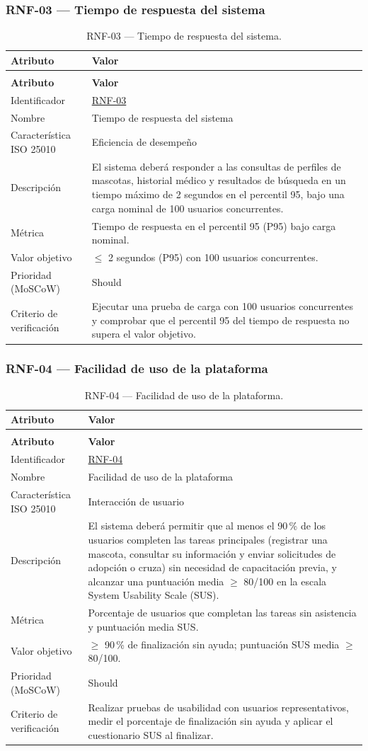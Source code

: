\documentclass[journal,onecolumn]{IEEEtran}
\makeatletter
\newenvironment{atributos}[2]{%
	\small
	\begin{longtable}{@{}>{\raggedright\arraybackslash}p{4.2cm} >{\raggedright\arraybackslash}p{11.2cm}@{}}
		\caption{#2}\label{tab:#1}\\
		\toprule
		\textbf{Atributo} & \textbf{Valor} \\
		\midrule
		\endfirsthead
		\multicolumn{2}{@{}l}{\small\itshape (continuación)}\\
		\toprule
		\textbf{Atributo} & \textbf{Valor} \\
		\midrule
		\endhead
		\bottomrule
		\endlastfoot
	}{%
	\end{longtable}
	\normalsize
}
\makeatother
\begin{document}
	
	\subsubsection{RNF-03 --- Tiempo de respuesta del sistema}
	
	\begin{atributos}{RNF-03}{RNF-03 --- Tiempo de respuesta del sistema.}
		Identificador & \hyperref[tab:RNF-03]{RNF-03} \\
		Nombre & Tiempo de respuesta del sistema \\
		Característica ISO 25010 & Eficiencia de desempeño \\
		Descripción & El sistema deberá responder a las consultas de perfiles de mascotas, historial médico y resultados de búsqueda en un tiempo máximo de 2 segundos en el percentil 95, bajo una carga nominal de 100 usuarios concurrentes. \\
		Métrica & Tiempo de respuesta en el percentil 95 (P95) bajo carga nominal. \\
		Valor objetivo & $\leq$ 2 segundos (P95) con 100 usuarios concurrentes. \\
		Prioridad (MoSCoW) & Should \\
		Criterio de verificación & Ejecutar una prueba de carga con 100 usuarios concurrentes y comprobar que el percentil 95 del tiempo de respuesta no supera el valor objetivo. \\
	\end{atributos}
	
	
	\subsubsection{RNF-04 --- Facilidad de uso de la plataforma}
	
	\begin{atributos}{RNF-04}{RNF-04 --- Facilidad de uso de la plataforma.}
		Identificador & \hyperref[tab:RNF-04]{RNF-04} \\
		Nombre & Facilidad de uso de la plataforma \\
		Característica ISO 25010 & Interacción de usuario \\
		Descripción & El sistema deberá permitir que al menos el 90\,\% de los usuarios completen las tareas principales (registrar una mascota, consultar su información y enviar solicitudes de adopción o cruza) sin necesidad de capacitación previa, y alcanzar una puntuación media $\geq$ 80/100 en la escala System Usability Scale (SUS). \\
		Métrica & Porcentaje de usuarios que completan las tareas sin asistencia y puntuación media SUS. \\
		Valor objetivo & $\geq$ 90\,\% de finalización sin ayuda; puntuación SUS media $\geq$ 80/100. \\
		Prioridad (MoSCoW) & Should \\
		Criterio de verificación & Realizar pruebas de usabilidad con usuarios representativos, medir el porcentaje de finalización sin ayuda y aplicar el cuestionario SUS al finalizar. \\
	\end{atributos}
	
\end{document}

